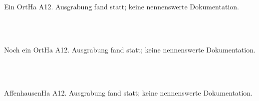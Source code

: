 \begin{multicols}{2}
	
\begin{entryForPlace}{Ein Ort}{Ha A1}{2}{\cite[69]{stachowiak}.}
Ausgrabung fand statt; keine nennenswerte Dokumentation. \lipsum[33]
\end{entryForPlace}\\[1em]

%
{\MinipageSkizze{\UrnenID}{\MIZ}{\Anthro}{\Kontext}{\Datierung}{\Literatur}{\Abb}{\Skizze}\\%
}

\begin{entryForPlace}{Noch ein Ort}{Ha A1}{2}{\cite[69]{stachowiak}.}
Ausgrabung fand statt; keine nennenswerte Dokumentation. \lipsum[33]
\end{entryForPlace}\\[1em]

%
{\MinipageSkizze{\UrnenID}{\MIZ}{\Anthro}{\Kontext}{\Datierung}{\Literatur}{\Abb}{\Skizze}\\%
}

\begin{entryForPlace}{Affenhausen}{Ha A1}{2}{\cite[69]{stachowiak}.}
Ausgrabung fand statt; keine nennenswerte Dokumentation. \lipsum[33]
\end{entryForPlace}\\[1em]

%
{\MinipageSkizze{\UrnenID}{\MIZ}{\Anthro}{\Kontext}{\Datierung}{\Literatur}{\Abb}{\Skizze}\\%
}

\end{multicols}